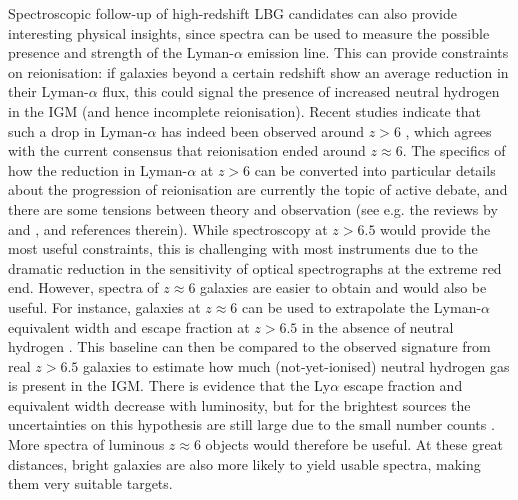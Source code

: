 Spectroscopic follow-up of high-redshift LBG candidates can also provide interesting physical insights, since spectra can  be used to measure the possible presence and strength of the Lyman-$\alpha$ emission line. This can provide constraints on reionisation: if galaxies beyond a certain redshift show an average reduction in their Lyman-$\alpha$ flux, this could signal the presence of increased neutral hydrogen in the IGM (and hence incomplete reionisation). Recent studies indicate that such a drop in Lyman-$\alpha$ has indeed been observed around $z>6$ \citep{2010MNRAS.408.1628S,2011ApJ...743..132P,2013Natur.502..524F,2014ApJ...793..113P}, which agrees with the current consensus that reionisation ended around $z\approx6$. The specifics of how the reduction in Lyman-$\alpha$ at $z>6$ can be converted into particular details about the progression of reionisation are currently the topic of active debate, and there are some tensions between theory and observation (see e.g. the reviews by \citealt{2014PASA...31...40D} and \citealt{2016PASA...33...37F}, and references therein). While spectroscopy at $z>6.5$ would provide the most useful constraints, this is challenging with most instruments due to the dramatic reduction in the sensitivity of optical spectrographs at the extreme red end. However, spectra of $z\approx6$ galaxies are easier to obtain and would also be useful. For instance, galaxies at $z\approx6$ can be used to extrapolate the Lyman-$\alpha$ equivalent width and escape fraction at $z>6.5$ in the absence of neutral hydrogen \citep{2009ApJ...697.1493S,2011ApJ...728L...2S}. This baseline can then be compared to the observed signature from real $z>6.5$ galaxies to estimate how much (not-yet-ionised) neutral hydrogen gas is present in the IGM. There is evidence that the Ly$\alpha$ escape fraction and equivalent width decrease with luminosity, but for the brightest sources the uncertainties on this hypothesis are still large due to the small number counts \citep{2009ApJ...697.1493S,2011ApJ...728L...2S,2012MNRAS.422.1425C}. More spectra of luminous $z\approx6$ objects would therefore be useful. At these great distances, bright galaxies are also more likely to yield usable spectra, making them very suitable targets.  \par


